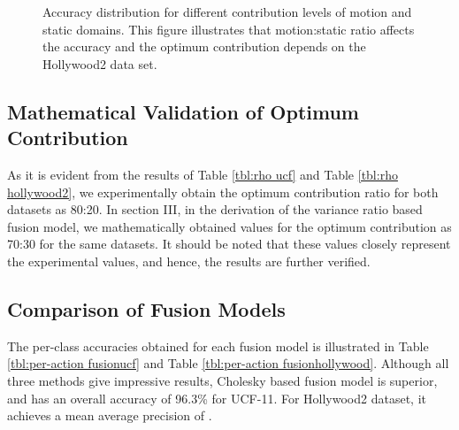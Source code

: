 \begin{figure}
\caption{Accuracy distribution for different contribution levels of motion and static domains.
This figure illustrates that motion:static ratio affects the accuracy and the optimum contribution depends on the Hollywood2 data set.}
\label{contribution chart}
\end{figure}

\subsection{Mathematical Validation of Optimum Contribution}

As it is evident from the results of Table \ref{tbl:rho ucf} and Table \ref{tbl:rho hollywood2}, we experimentally obtain the
optimum contribution ratio for both datasets as 80:20. In section III, in the derivation of the variance ratio based fusion model,
we mathematically obtained values for the optimum contribution as 70:30 for the same datasets. It should be noted that these values closely
represent the experimental values, and hence, the results are further verified.

\subsection{Comparison of Fusion Models}
The per-class accuracies obtained for each fusion model is illustrated in Table \ref{tbl:per-action fusionucf} and
Table \ref{tbl:per-action fusionhollywood}. Although all three methods give impressive results, Cholesky based fusion
model is superior, and has an overall accuracy of 96.3\% for UCF-11. For Hollywood2 dataset, it achieves a mean average precision
of .


